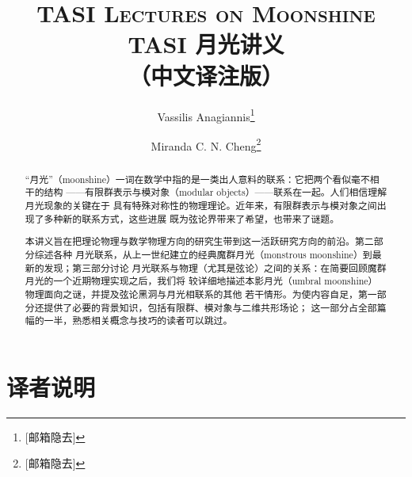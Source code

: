 \documentclass[11pt,a4paper,fontset=windows]{ctexart}
\numberwithin{equation}{section}
\begin{document}
\title{%
  \vspace{-35pt}
  \textsc{\huge TASI Lectures on Moonshine}\\[8pt]
  \Large TASI 月光讲义\\[2pt]
  \large（中文译注版）}
\author[1]{Vassilis Anagiannis\thanks{[邮箱隐去]}}
\author[1,2]{Miranda C. N. Cheng\thanks{[邮箱隐去]}}
\date{}
\maketitle

\begin{abstract}
\normalsize
“月光”（moonshine）一词在数学中指的是一类出人意料的联系：它把两个看似毫不相干的结构
——有限群表示与模对象（modular objects）——联系在一起。人们相信理解月光现象的关键在于
具有特殊对称性的物理理论。近年来，有限群表示与模对象之间出现了多种新的联系方式，这些进展
既为弦论界带来了希望，也带来了谜题。

本讲义旨在把理论物理与数学物理方向的研究生带到这一活跃研究方向的前沿。第二部分综述各种
月光联系，从上一世纪建立的经典魔群月光（monstrous moonshine）到最新的发现；第三部分讨论
月光联系与物理（尤其是弦论）之间的关系：在简要回顾魔群月光的一个近期物理实现之后，我们将
较详细地描述本影月光（umbral moonshine）物理面向之谜，并提及弦论黑洞与月光相联系的其他
若干情形。为使内容自足，第一部分还提供了必要的背景知识，包括有限群、模对象与二维共形场论；
这一部分占全部篇幅的一半，熟悉相关概念与技巧的读者可以跳过。
\end{abstract}

\newpage

\section*{译者说明}
\end{document}
